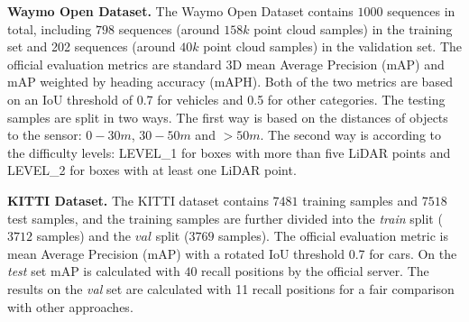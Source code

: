\documentclass[10pt,twocolumn,letterpaper]{article}
\begin{document}
\begin{table*}[]
\setlength{\belowcaptionskip}{10pt}
\caption{Performance comparison on the Waymo Open Dataset \textit{test} leaderboard for the vehicle detection. $\star$: test submissions are the modified version of original architectures. $\ddag$: We append another frame following~\cite{shi2020pv} and use a larger voxel backbone.} \label{table_waymo_2}
\vspace{-4mm}
\end{table*}

\noindent\textbf{Waymo Open Dataset.} The Waymo Open Dataset contains $1000$ sequences in total, including $798$ sequences (around $158k$ point cloud samples) in the training set and 202 sequences (around $40k$ point cloud samples) in the validation set. The official evaluation metrics are standard 3D mean Average Precision (mAP) and mAP weighted by heading accuracy (mAPH). Both of the two metrics are based on an IoU threshold of 0.7 for vehicles and 0.5 for other categories. The testing samples are split in two ways. The first way is based on the distances of objects to the sensor: $0-30m$, $30-50m$ and $>50m$. The second way is according to the difficulty levels: LEVEL\_1 for boxes with more than five LiDAR points and LEVEL\_2 for boxes with at least one LiDAR point.

\noindent\textbf{KITTI Dataset.} The KITTI dataset contains $7481$ training samples and $7518$ test samples, and the training samples are further divided into the \textit{train} split ($3712$ samples) and the $val$ split ($3769$ samples). The official evaluation metric is mean Average Precision (mAP) with a rotated IoU threshold 0.7 for cars. On the \textit{test} set mAP is calculated with $40$ recall positions by the official server. The results on the \textit{val} set are calculated with 11 recall positions for a fair comparison with other approaches.
\end{document}
